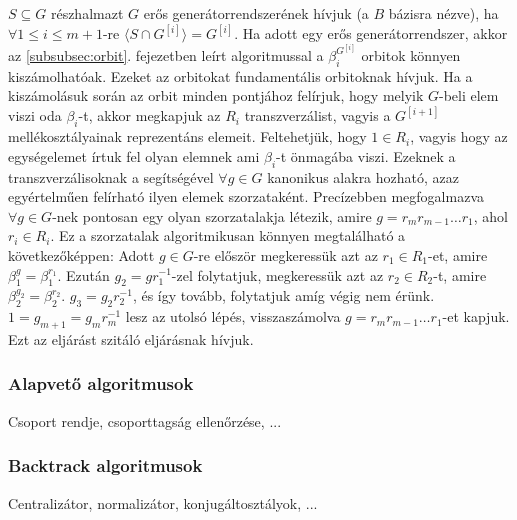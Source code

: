 $S \subseteq G$ részhalmazt $G$ erős generátorrendszerének hívjuk (a $B$ bázisra nézve), ha $\forall 1\le i \le m+1$-re $\langle S \cap G^{[i]} \rangle = G^{[i]}$.
Ha adott egy erős generátorrendszer, akkor az \ref{subsubsec:orbit}. fejezetben leírt algoritmussal a $\beta_i^{G^{[i]}}$ orbitok könnyen kiszámolhatóak.
Ezeket az orbitokat fundamentális orbitoknak hívjuk.
Ha a kiszámolásuk során az orbit minden pontjához felírjuk, hogy melyik $G$-beli elem viszi oda $\beta_i$-t, akkor megkapjuk az $R_i$ transzverzálist,
vagyis a $G^{[i+1]}$ mellékosztályainak reprezentáns elemeit.
Feltehetjük, hogy $1 \in R_i$, vagyis hogy az egységelemet írtuk fel olyan elemnek ami $\beta_i$-t önmagába viszi. Ezeknek a transzverzálisoknak a segítségével
$\forall g \in G$ kanonikus alakra hozható, azaz egyértelműen felírható ilyen elemek szorzataként.
Precízebben megfogalmazva $\forall g \in G$-nek pontosan egy olyan szorzatalakja létezik, amire $g = r_m r_{m-1} \dots r_1$, ahol $r_i \in R_i$.
Ez a szorzatalak algoritmikusan könnyen megtalálható a következőképpen: Adott $g \in G$-re először megkeressük azt az $r_1 \in R_1$-et, amire $\beta_1^g = \beta_1^{r_1}$.
Ezután $g_2 = g r_1^{-1}$-zel folytatjuk, megkeressük azt az $r_2 \in R_2$-t, amire $\beta_2^{g_2} = \beta_2^{r_2}$. $g_3 = g_2 r_2^{-1}$, és így tovább, folytatjuk amíg végig nem érünk.
$1 = g_{m+1} = g_{m} r_m^{-1}$ lesz az utolsó lépés, visszaszámolva $g = r_m r_{m-1} \dots r_1$-et kapjuk. Ezt az eljárást szitáló eljárásnak hívjuk.

\subsubsection{Alapvető algoritmusok}
\label{subsubsec:permbasic}
Csoport rendje, csoporttagság ellenőrzése, ...

\subsubsection{Backtrack algoritmusok}
\label{subsubsec:permbt}
Centralizátor, normalizátor, konjugáltosztályok, ...
